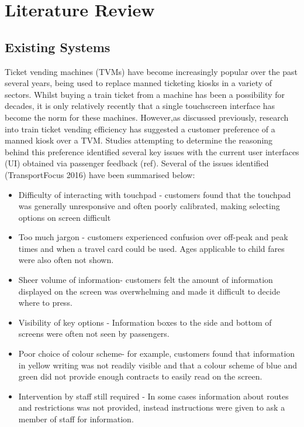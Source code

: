 \section{Literature Review}
\subsection{Existing Systems}
Ticket vending machines (TVMs) have become increasingly popular over the past several years, being used to replace manned ticketing kiosks in a variety of sectors. Whilst buying a train ticket from a machine has been a possibility for decades, it is only relatively recently that a single touchscreen interface has become the norm for these machines. However,as discussed previously,  research into train ticket vending efficiency has suggested a customer preference of a manned kiosk over a TVM. Studies attempting to determine the reasoning behind this preference identified several key issues with the current user interfaces (UI) obtained via passenger feedback (ref). Several of the issues identified (TransportFocus 2016) have been summarised below:

\begin{itemize}
	\item Difficulty of interacting with touchpad - customers found that the touchpad was generally unresponsive and often poorly calibrated, making selecting options on screen difficult
	\item Too much jargon - customers experienced confusion over off-peak and peak times and when a travel card could be used. Ages applicable to child fares were also often not shown.
	\item Sheer volume of information- customers felt the amount of information displayed on the screen was overwhelming and made it difficult to decide where to press.
	\item Visibility of key options - Information boxes to the side and bottom of screens were often not seen by passengers.
	\item Poor choice of colour scheme- for example, customers found that information in yellow writing was not readily visible and that a colour scheme of blue and green did not provide enough contracts to easily read on the screen.
	\item Intervention by staff still required - In some cases information about routes and restrictions was not provided, instead instructions were given to ask a member of staff for information.
\end{itemize}


